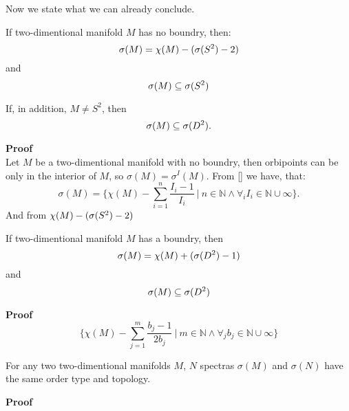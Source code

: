 Now we state what we can already conclude. 
\begin{observation}
If two-dimentional manifold $M$ has no boundry, then:
\begin{equation} 
\sigma(M) = \chi(M) - ({\mathcal{\sigma}(S^2)} - 2) 
\end{equation}
and
\begin{equation} 
\sigma(M) \subseteq {\mathcal{\sigma}(S^2)} 
\end{equation} 

If, in addition, $M \neq S^2$, then 
\begin{equation} 
\sigma(M) \subseteq {\mathcal{\sigma}(D^2)}. 
\end{equation}

\end{observation}
\textbf{Proof} \\
Let $M$ be a two-dimentional manifold with no boundry, then orbipoints can be only in the interior 
of $M$, so $\sigma(M) = \sigma^I(M)$. From \ref{} we have, that: 
\begin{equation}
\sigma(M) = \{\chi(M) - \sum_{i=1}^n 
\frac{I_i-1}{I_i}\ |\ n \in \mathbb{N} \land \forall_i I_i \in \mathbb{N} \cup \infty\}.
\end{equation}
And from 
$\chi(M) - ({\mathcal{\sigma}(S^2)} - 2)$
\begin{observation}
If two-dimentional manifold  $M$ has a boundry, then 
\begin{equation}
\sigma(M) = \chi(M) + ({\mathcal{\sigma}(D^2)} - 1)
\end{equation}
and 
\begin{equation}
\sigma(M) \subseteq {\mathcal{\sigma}(D^2)}
\end{equation}
\end{observation}
\textbf{Proof} \\
\begin{equation}
\{\chi(M) - \sum_{j=1}^m 
\frac{b_j-1}{2b_j}\ |\ m \in \mathbb{N} \land \forall_j b_j \in \mathbb{N} \cup \infty\} 
\end{equation}

\begin{theorem}\label{all_spectra_are_isomorphic}
For any two two-dimentional manifolds $M$, $N$ spectras $\sigma(M)$ and $\sigma(N)$ have the same 
order type and topology. 
\end{theorem}
\textbf{Proof} \\



